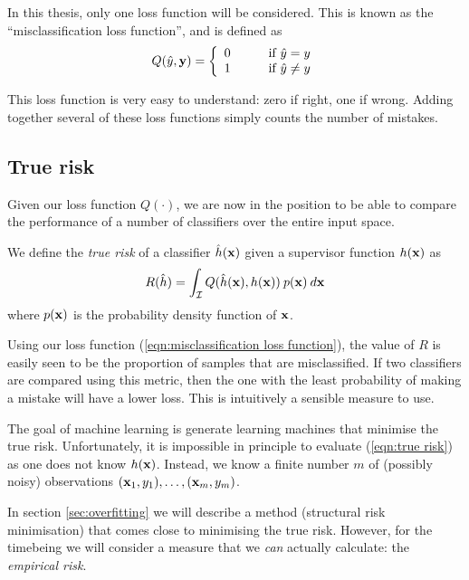 In this thesis, only one loss function will be considered.  This is
known as the ``misclassification loss function'', and is defined as
%
\begin{equation}
Q(\hat{y}, \mathbf{y}) = \left\{
\begin{array}{ll}
	0	&	\qquad \mbox{if $\hat{y} = y$} \\
	1	&	\qquad \mbox{if $\hat{y} \neq y$}
\end{array}
\right.
\label{eqn:misclassification loss function}
\end{equation}

This loss function is very easy to understand: zero if right, one if
wrong.  Adding together several of these loss functions simply counts
the number of mistakes.


\subsection{True risk}
\label{sec:true risk}
Given our loss function $Q(\cdot)$, we are now in the position to be
able to compare the performance of a number of classifiers over the
entire input space.

\begin{definition}
We define the \emph{true risk} of a classifier $\hat{h}(\mathbf{x})$ given a
supervisor function $h(\mathbf{x})$ as 
%
\begin{equation}
R(\hat{h}) = \int_{\mathcal{I}} Q(\hat{h}(\mathbf{x}), h(\mathbf{x})) \: p(\mathbf{x}) \: d\mathbf{x}
\label{eqn:true risk}
\end{equation}
%
where $p(\mathbf{x})$ is the probability density function of $\mathbf{x}$.
\end{definition}


Using our loss function (\ref{eqn:misclassification loss function}), the
value of $R$ is easily seen to be the proportion of samples that are
misclassified.  If two classifiers are compared using this metric,
then the one with the least probability of making a mistake will have
a lower loss.  This is intuitively a sensible measure to use.

The goal of machine learning is generate learning machines that
minimise the true risk.  Unfortunately, it is impossible in
principle to evaluate (\ref{eqn:true risk}) as one does not know
$h(\mathbf{x})$.   Instead, we know a finite number $m$ of (possibly noisy)
observations $(\mathbf{x}_1, y_1), \ldots, (\mathbf{x}_m, y_m)$.

In section \ref{sec:overfitting} we will describe a method (structural
risk minimisation) that comes close to minimising the true risk.
However, for the timebeing we will consider a measure that we
\emph{can} actually calculate: the \emph{empirical risk}.


